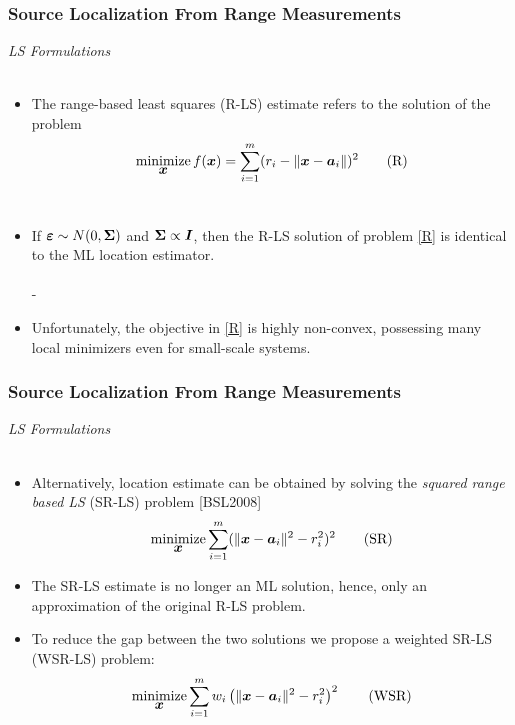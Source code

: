 \documentclass [t] {beamer} %
\begin{document}
\begin{frame} %
\frametitle{Source Localization From Range Measurements}
{\large \textit{LS Formulations}} \\~\\
\normalsize
\begin{itemize}
\item 
The range-based least squares (R-LS) estimate refers to the solution of the problem
\begin{equation} \label{R} 
\mathop{\mbox{minimize}}_{\mbox{\boldmath$x$}} f(\mbox{\boldmath$x$})=\sum_{i=1}^{m} (r_i - \|{\mbox{\boldmath$x$}} - {\mbox{\boldmath$a$}}_i\|)^2	\tag{R}
\end{equation} \\
\item If $\mbox{\boldmath${\varepsilon}$} \sim N(0,\mbox{\boldmath${\Sigma}$}) $ and $\mbox{\boldmath${\Sigma}$} \propto \mbox{\boldmath$I$}$, then the R-LS solution of problem \eqref{R} is identical to the ML location estimator. \\ ~\\
- \item  Unfortunately, the objective in \eqref{R} is highly non-convex, possessing many local minimizers even for small-scale systems.

\end{itemize}
\end{frame}



\begin{frame}
\frametitle{Source Localization From Range Measurements}
{\large \textit{LS Formulations}} \\~\\
\normalsize
\begin{itemize}
\item 
Alternatively, location estimate can be obtained by solving the \textit{squared range based LS} (SR-LS) problem [BSL2008]
\begin{equation} \label{SR}
\mathop{\mbox{minimize}}_{\mbox{\boldmath$x$}} \sum_{i=1}^{m} (\|{\mbox{\boldmath$x$}} - {\mbox{\boldmath$a$}}_i\|^2 - r_i^2)^2 \tag{SR}
\end{equation}

\item  
The SR-LS estimate is no longer an ML solution, hence, only an approximation of the original R-LS problem.\\
\item 
To reduce the gap between the two solutions we propose a weighted SR-LS (WSR-LS) problem:
\begin{equation} \label{WSR}
\mathop{\mbox{minimize}}_{\mbox{\boldmath$x$}} \sum_{i=1}^{m} w_i\left(\|{\mbox{\boldmath$x$}} - {\mbox{\boldmath$a$}}_i\|^2 - r_i^2\right)^2 \tag{WSR}
\end{equation}
\end{itemize}
\end{frame}
\end{document}
